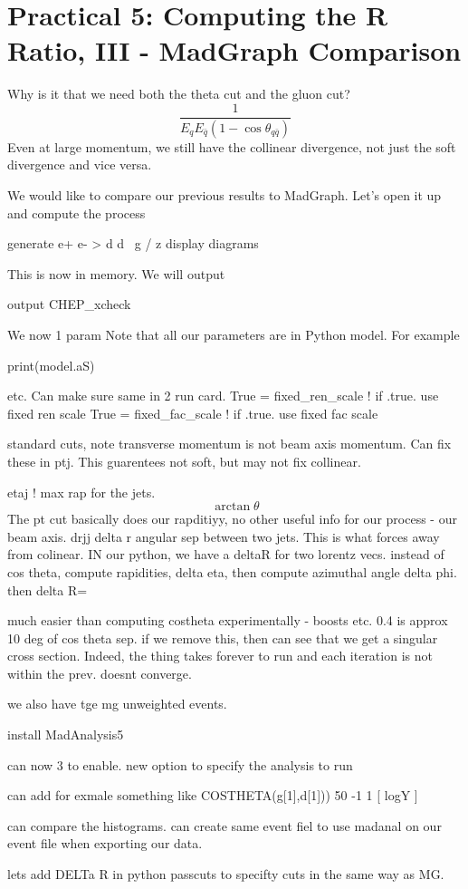 \section*{Practical 5: Computing the R Ratio, III - MadGraph Comparison }


Why is it that we need both the theta cut and the gluon cut?
\begin{equation}
    \frac{1}{E_qE_{\bar{q}}(1-\cos\theta_{q\bar{q}})}
\end{equation}
Even at large momentum, we still have the collinear divergence, not just the soft divergence and vice versa.

We would like to compare our previous results to MadGraph. Let's open it up and compute the process
\begin{codeenv}
    generate e+ e- > d d~ g / z
display diagrams
\end{codeenv}
This is now in memory. We will output
\begin{codeenv}
    output CHEP_xcheck
\end{codeenv}
We now 
1 param
Note that all our parameters are in Python model. For example
\begin{codeenv}
   print(model.aS)
\end{codeenv}
etc. Can make sure same in 
2 run card. 
 True = fixed_ren_scale  ! if .true. use fixed ren scale
     True = fixed_fac_scale  ! if .true. use fixed fac scale

standard cuts, note transverse momentum is not beam axis momentum. Can fix these in ptj. This guarentees not soft, but may not fix collinear.

etaj    ! max rap for the jets. 
\begin{equation}
    \arctan \theta
\end{equation}
The pt cut basically does our rapditiyy, no other useful info for our process - our beam axis.
drjj 
delta r angular sep between two jets. This is what forces away from colinear. IN our python, we have a deltaR for two lorentz vecs.
instead of cos theta, compute rapidities, delta eta, then compute azimuthal angle delta phi. then delta R= 

much easier than computing costheta experimentally - boosts etc.
0.4 is approx 10 deg of cos theta sep. if we remove this, then can see that we get a singular cross section. Indeed, the thing takes forever to run and each iteration is not within the prev. doesnt converge.

we also have tge mg unweighted events.

install MadAnalysis5

can now 3 to enable.
new option to specify the analysis to run

can add for exmale something like COSTHETA(g[1],d[1])) 50 -1 1 [ logY ]

can compare the histograms. can create same event fiel to use madanal on our event file when exporting our data.

lets add DELTa R in python passcuts to specifty cuts in  the same way as MG.